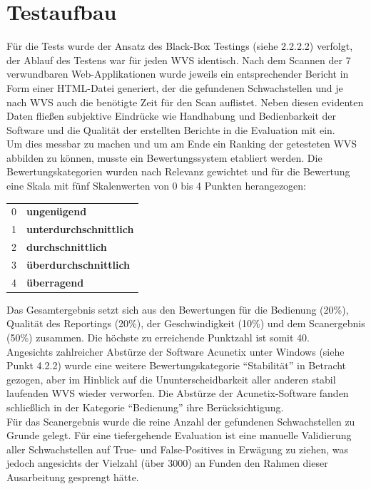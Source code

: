 \documentclass[12pt,oneside,a4paper,parskip]{scrbook}
\begin{document}
  \section{Testaufbau}
  Für die Tests wurde der Ansatz des Black-Box Testings (siehe 2.2.2.2) verfolgt, der Ablauf des Testens war für jeden WVS identisch.
  Nach dem Scannen der 7 verwundbaren Web-Applikationen wurde jeweils ein entsprechender Bericht in Form einer HTML-Datei generiert, der die gefundenen Schwachstellen und je nach WVS auch die benötigte Zeit für den Scan auflistet.
  Neben diesen evidenten Daten fließen subjektive Eindrücke wie Handhabung und Bedienbarkeit der Software und die Qualität der erstellten Berichte in die Evaluation mit ein.\\
  Um dies messbar zu machen und um am Ende ein Ranking der getesteten WVS abbilden zu können, musste ein Bewertungssystem etabliert werden. Die Bewertungskategorien wurden nach Relevanz gewichtet und für die Bewertung eine Skala mit fünf Skalenwerten von 0 bis 4 Punkten herangezogen:
  \begin{table}[H]
     \begin{tabular}{ll}
     0         & \textbf{ungenügend}             \\
     1         & \textbf{unterdurchschnittlich}  \\
     2         & \textbf{durchschnittlich}       \\
     3         & \textbf{überdurchschnittlich}   \\
     4         & \textbf{überragend}
     \end{tabular}
   \end{table}
   Das Gesamtergebnis setzt sich aus den Bewertungen für die Bedienung (20\%), Qualität des Reportings (20\%), der Geschwindigkeit (10\%) und dem Scanergebnis (50\%) zusammen. Die höchste zu erreichende Punktzahl ist somit 40.\\
   Angesichts zahlreicher Abstürze der Software Acunetix unter Windows (siehe Punkt 4.2.2) wurde eine weitere Bewertungskategorie ``Stabilität'' in Betracht gezogen, aber im Hinblick auf die Ununterscheidbarkeit aller anderen stabil laufenden WVS wieder verworfen. Die Abstürze der Acunetix-Software fanden schließlich in der Kategorie ``Bedienung'' ihre Berücksichtigung.\\
   Für das Scanergebnis wurde die reine Anzahl der gefundenen Schwachstellen zu Grunde gelegt. Für eine tiefergehende Evaluation ist eine manuelle Validierung aller Schwachstellen auf True- und False-Positives in Erwägung zu ziehen, was jedoch angesichts der Vielzahl (über 3000) an Funden den Rahmen dieser Ausarbeitung gesprengt hätte.
\end{document}

